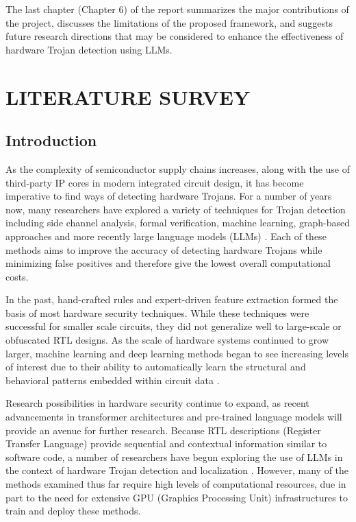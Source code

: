 \documentclass[12pt,a4paper]{report}
\begin{document}
The last chapter (Chapter 6) of the report summarizes the major contributions of the project, discusses the limitations of the proposed framework, and suggests future research directions that may be considered to enhance the effectiveness of hardware Trojan detection using LLMs.



\chapter{LITERATURE SURVEY}

\section{Introduction}

As the complexity of semiconductor supply chains increases, along with the use of third-party IP cores in modern integrated circuit design, it has become imperative to find ways of detecting hardware Trojans. For a number of years now, many researchers have explored a variety of techniques for Trojan detection including side channel analysis, formal verification, machine learning, graph-based approaches and more recently large language models (LLMs) \cite{ref1,ref4,ref5,ref6,ref7}. Each of these methods aims to improve the accuracy of detecting hardware Trojans while minimizing false positives and therefore give the lowest overall computational costs.

In the past, hand-crafted rules and expert-driven feature extraction formed the basis of most hardware security techniques. While these techniques were successful for smaller scale circuits, they did not generalize well to large-scale or obfuscated RTL designs. As the scale of hardware systems continued to grow larger, machine learning and deep learning methods began to see increasing levels of interest due to their ability to automatically learn the structural and behavioral patterns embedded within circuit data \cite{ref4}.

Research possibilities in hardware security continue to expand, as recent advancements in transformer architectures and pre-trained language models will provide an avenue for further research. Because RTL descriptions (Register Transfer Language) provide sequential and contextual information similar to software code, a number of researchers have begun exploring the use of LLMs in the context of hardware Trojan detection and localization \cite{ref1,ref3,ref5}. However, many of the methods examined thus far require high levels of computational resources, due in part to the need for extensive GPU (Graphics Processing Unit) infrastructures to train and deploy these methods.
\end{document}
